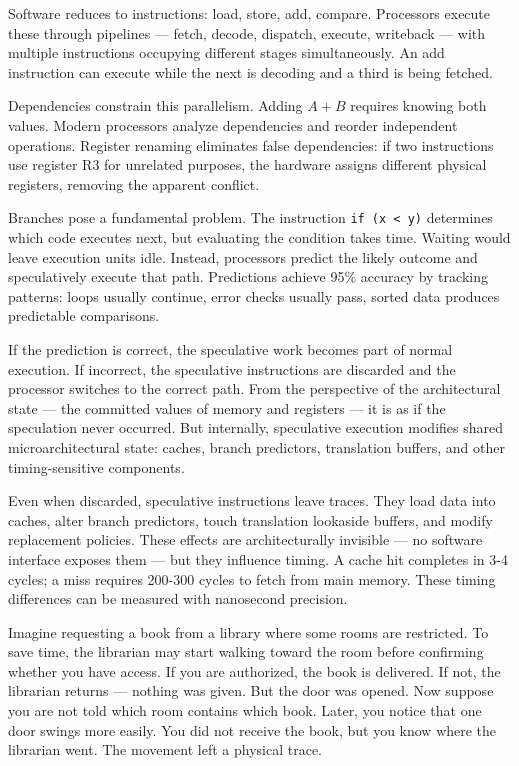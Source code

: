 Software reduces to instructions: load, store, add, compare. Processors execute these through pipelines — fetch, decode, dispatch, execute, writeback — with multiple instructions occupying different stages simultaneously. An add instruction can execute while the next is decoding and a third is being fetched.

Dependencies constrain this parallelism. Adding $A+B$ requires knowing both values. Modern processors analyze dependencies and reorder independent operations. Register renaming eliminates false dependencies: if two instructions use register R3 for unrelated purposes, the hardware assigns different physical registers, removing the apparent conflict.

Branches pose a fundamental problem. The instruction \texttt{if (x < y)} determines which code executes next, but evaluating the condition takes time. Waiting would leave execution units idle. Instead, processors predict the likely outcome and speculatively execute that path. Predictions achieve 95\% accuracy by tracking patterns: loops usually continue, error checks usually pass, sorted data produces predictable comparisons.

If the prediction is correct, the speculative work becomes part of normal execution. If incorrect, the speculative instructions are discarded and the processor switches to the correct path. From the perspective of the architectural state — the committed values of memory and registers — it is as if the speculation never occurred. But internally, speculative execution modifies shared microarchitectural state: caches, branch predictors, translation buffers, and other timing-sensitive components.

Even when discarded, speculative instructions leave traces. They load data into caches, alter branch predictors, touch translation lookaside buffers, and modify replacement policies. These effects are architecturally invisible — no software interface exposes them — but they influence timing. A cache hit completes in 3-4 cycles; a miss requires 200-300 cycles to fetch from main memory. These timing differences can be measured with nanosecond precision.

Imagine requesting a book from a library where some rooms are restricted. To save time, the librarian may start walking toward the room before confirming whether you have access. If you are authorized, the book is delivered. If not, the librarian returns — nothing was given. But the door was opened. Now suppose you are not told which room contains which book. Later, you notice that one door swings more easily. You did not receive the book, but you know where the librarian went. The movement left a physical trace.

